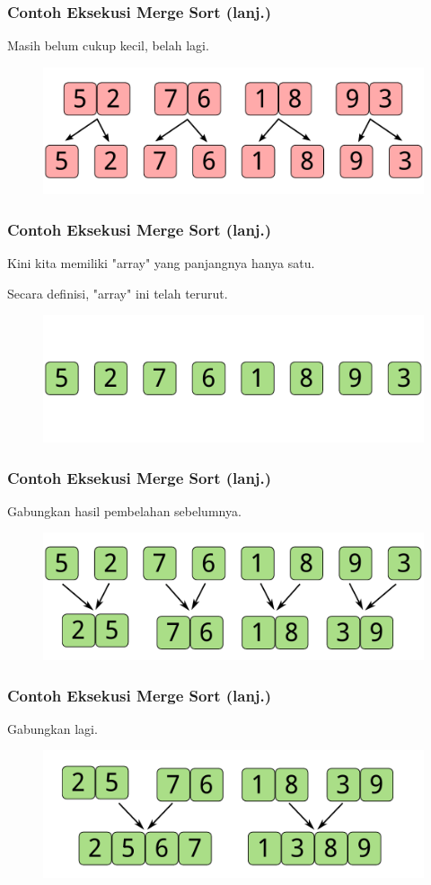 \begin{frame}
\frametitle{Contoh Eksekusi Merge Sort (lanj.)}
Masih belum cukup kecil, belah lagi.
\begin{figure}
  \centering
  \includegraphics[width=10 cm]{asset/merge-sort-demo-3.pdf}
\end{figure}
\end{frame}

\begin{frame}
\frametitle{Contoh Eksekusi Merge Sort (lanj.)}
Kini kita memiliki "array" yang panjangnya hanya satu.\newline

Secara definisi, "array" ini telah terurut.
\begin{figure}
  \centering
  \includegraphics[width=10 cm]{asset/merge-sort-demo-4.pdf}
\end{figure}
\end{frame}

\begin{frame}
\frametitle{Contoh Eksekusi Merge Sort (lanj.)}
Gabungkan hasil pembelahan sebelumnya.
\begin{figure}
  \centering
  \includegraphics[width=10 cm]{asset/merge-sort-demo-5.pdf}
\end{figure}
\end{frame}

\begin{frame}
\frametitle{Contoh Eksekusi Merge Sort (lanj.)}
Gabungkan lagi.
\begin{figure}
  \centering
  \includegraphics[width=10 cm]{asset/merge-sort-demo-6.pdf}
\end{figure}
\end{frame}

